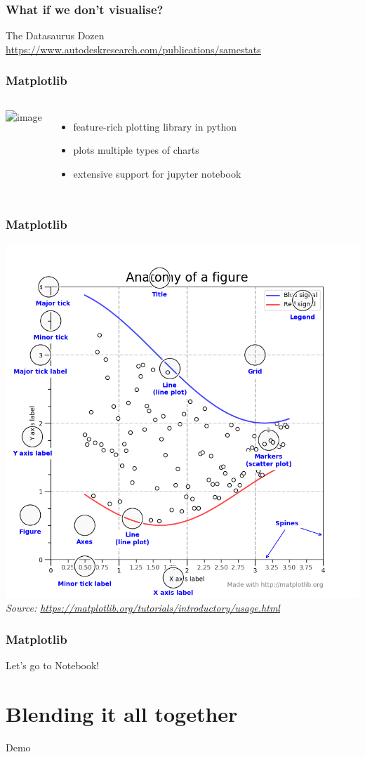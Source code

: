 \documentclass[aspectratio=169]{beamer}
\begin{document}
\begin{frame}
    \frametitle{What if we don't visualise?}
    \centering
    \Huge{The Datasaurus Dozen}\\
    {\small \url{https://www.autodeskresearch.com/publications/samestats}}
\end{frame}

\begin{frame}
    \frametitle{Matplotlib}
    \begin{columns}
            \includegraphics<2->[width=\columnwidth]{images/matplotlib-logo.png}
            \begin{itemize}[<+(2)->]
                \item feature-rich plotting library in python
                \item plots multiple types of charts
                \item extensive support for jupyter notebook
            \end{itemize}
    \end{columns}
\end{frame}

\begin{frame}
    \frametitle{Matplotlib}
    \centering
    \includegraphics[scale=0.22]{images/matplotlib-anatomy.png}\\
    {\small \textit{Source: \url{https://matplotlib.org/tutorials/introductory/usage.html}}}
\end{frame}

\begin{frame}
    \frametitle{Matplotlib}
    \centering
    { \Huge Let's go to Notebook! }
\end{frame}

\section{Blending it all together}

\begin{frame}
    \centering
    \Huge{Demo}
\end{frame}
\end{document}
